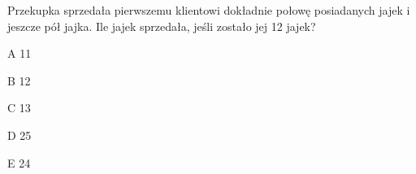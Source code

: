 \begin{tresc}
Przekupka sprzedała pierwszemu klientowi dokładnie połowę posiadanych jajek i jeszcze pół jajka. Ile jajek sprzedała, jeśli zostało jej 12 jajek?
\end{tresc}
\begin{wariant}{A} 11 \end{wariant}
\begin{wariant}{B} 12 \end{wariant}
\begin{wariant}{C} 13 \end{wariant}
\begin{wariant}{D} 25 \end{wariant}
\begin{wariant}{E} 24 \end{wariant}
